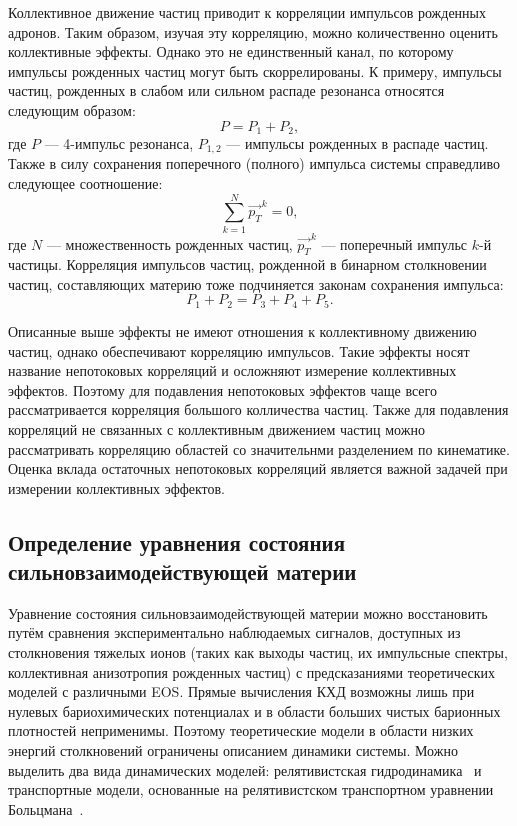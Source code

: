 Коллективное движение частиц приводит к корреляции импульсов рожденных адронов.
Таким образом, изучая эту корреляцию, можно количественно оценить коллективные эффекты.
Однако это не единственный канал, по которому импульсы рожденных частиц могут быть скоррелированы.
К примеру, импульсы частиц, рожденных в слабом или сильном распаде резонанса относятся следующим образом:
%
\begin{equation}
    P = P_1 + P_2,
\end{equation}
где $P$ --- 4-импульс резонанса, $P_{1,2}$ --- импульсы рожденных в распаде частиц.
Также в силу сохранения поперечного (полного) импульса системы справедливо следующее соотношение:
%
\begin{equation}
    \sum_{k=1}^{N} \vec{p_T}^k = 0,
\end{equation}
где $N$ --- множественность рожденных частиц, $\vec{p_{T}}^k$ --- поперечный импульс $k$-й частицы.
Корреляция импульсов частиц, рожденной в бинарном столкновении частиц, составляющих материю тоже подчиняется законам сохранения импульса:
%
\begin{equation}
    P_1 + P_2 = P_3 + P_4 + P_5.
\end{equation}

Описанные выше эффекты не имеют отношения к коллективному движению частиц, однако обеспечивают корреляцию импульсов.
Такие эффекты носят название непотоковых корреляций и осложняют измерение коллективных эффектов.
Поэтому для подавления непотоковых эффектов чаще всего рассматривается корреляция большого колличества частиц.
Также для подавления корреляций не связанных с коллективным движением частиц можно рассматривать корреляцию областей со значительнми разделением по кинематике.
Оценка вклада остаточных непотоковых корреляций является важной задачей при измерении коллективных эффектов.

\subsection{Определение уравнения состояния сильновзаимодействующей материи}

Уравнение состояния сильновзаимодействующей материи можно восстановить путём сравнения экспериментально наблюдаемых сигналов, доступных из столкновения тяжелых ионов (таких как выходы частиц, их импульсные спектры, коллективная анизотропия рожденных частиц) с предсказаниями теоретических моделей с различными EOS.
Прямые вычисления КХД возможны лишь при нулевых бариохимических потенциалах и в области больших чистых барионных плотностей неприменимы.
Поэтому теоретические модели в области низких энергий столкновений ограничены описанием динамики системы.
Можно выделить два вида динамических моделей: релятивистская гидродинамика~\cite{Stoecker:1986ci,Hung:1994eq,Werner:2010aa} и транспортные модели, основанные на релятивистском транспортном уравнении Больцмана~\cite{Molnar:2004yh,Xu:2004mz}.

